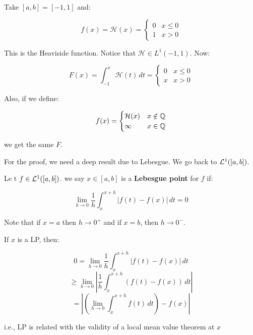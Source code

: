 \begin{fexample}
    Take $[a, b] = [-1, 1]$ and:

    $$f(x) = \mathcal{H}(x) = \begin{cases}
        0 & x \leq 0 \\
        1 & x > 0
    \end{cases}$$

    This is the Heaviside function. Notice that $\mathcal{H} \in L^1(-1, 1)$.
    Now:

    $$F(x) = \int_{-1}^x \mathcal{H}(t) \, dt = \begin{cases}
        0 & x \leq 0 \\
        x & x > 0
    \end{cases}
    $$

    Also, if we define:

    $$f(x) = \begin{cases}
        \mathcal{H}(x) & x \notin \mathbb{Q}\\
        \infty & x \in \mathbb{Q}
    \end{cases}$$

    we get the same $F$.
\end{fexample}

\begin{note}
    For the proof, we need a deep result due to Lebesgue. We go back to
    $\mathcal{L}^1([a, b])$.
\end{note}

\vspace{1em}

\begin{fdefinition}
    Le t $f \in \mathcal{L}^1([a,b])$. we say $x \in [a, b]$ is a \textbf{Lebesgue point}
    for $f$ if:

    $$ \lim_{h \to 0} \frac{1}{h} \int_{x}^{x+h} |f(t) - f(x)| \, dt = 0$$

    Note that if $x = a$ then $h \to 0^+$ and if $x = b$, then $h \to 0^-$.
\end{fdefinition}

\begin{fremark}
    If $x$ is a LP, then:

    $$0 = \lim_{h \to 0} \frac{1}{h} \int_{x}^{x + h} |f(t) - f(x)| \, dt$$
    $$ \geq \lim_{h \to 0} \left| \frac{1}{h} \int_x^{x+h} (f(t) - f(x)) \, dt \right|$$
    $$ = \left| \left( \lim_{h \to 0} \int_x^{x+h} f(t) \, dt \right) - f(x) \right|$$

    i.e., LP is related with the validity of a local mean value theorem at $x$
\end{fremark}

